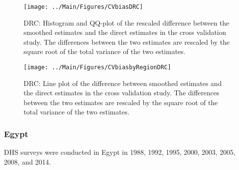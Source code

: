 \documentclass[12pt]{article}\usepackage[]{graphicx}\usepackage[]{color}
\newenvironment{knitrout}{}{} %
\begin{document}
\begin{knitrout}
\color{fgcolor}\begin{figure}[bht]

{\centering \texttt{[image: ../Main/Figures/CVbiasDRC]} 

}

\caption[DRC]{DRC: Histogram and QQ-plot of the rescaled difference between the smoothed estimates and the direct estimates in the cross validation study. The differences between the two estimates are rescaled by the square root of the total variance of the two estimates.}\label{fig:unnamed-chunk-99}
\end{figure}


\end{knitrout}

\begin{knitrout}
\color{fgcolor}\begin{figure}[bht]

{\centering \texttt{[image: ../Main/Figures/CVbiasbyRegionDRC]} 

}

\caption[DRC]{DRC: Line plot of the difference between smoothed estimates and the direct estimates in the cross validation study. The differences between the two estimates are rescaled by the square root of the total variance of the two estimates.}\label{fig:unnamed-chunk-100}
\end{figure}


\end{knitrout}


\clearpage
\subsubsection{Egypt}





DHS surveys were conducted in Egypt in 1988, 1992, 1995, 2000, 2003, 2005, 2008, and 2014.
\end{document}
